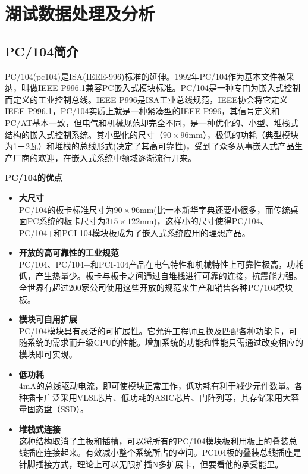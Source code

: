 %
\chapter{湖试数据处理及分析}
\section{PC/104简介}
PC/104(pc104)是ISA(IEEE-996)标准的延伸。1992年PC/104作为基本文件被采纳，叫做IEEE-P996.1兼容PC嵌入式模块标准。PC/104是一种专门为嵌入式控制而定义的工业控制总线。IEEE-P996是ISA工业总线规范，IEEE协会将它定义IEEE-P996.1，PC/104实质上就是一种紧凑型的IEEE-P996，其信号定义和PC/AT基本一致，但电气和机械规范却完全不同，是一种优化的、小型、堆栈式结构的嵌入式控制系统。其小型化的尺寸（$90\times 96$mm），极低的功耗（典型模块为1－2瓦）和堆栈的总线形式(决定了其高可靠性)，受到了众多从事嵌入式产品生产厂商的欢迎，在嵌入式系统中领域逐渐流行开来。

\textbf{\xiaoer PC/104的优点}
\begin{itemize}
  \item\textbf{\sanhao 大尺寸}\\
    PC/104的板卡标准尺寸为$90\times 96$mm(比一本新华字典还要小很多，而传统桌面PC系统的板卡尺寸为$315\times 122$mm)，这样小的尺寸使得PC/104、PC/104+和PCI-104模块板成为了嵌入式系统应用的理想产品。
  \item\textbf{\sanhao 开放的高可靠性的工业规范}\\ PC/104、PC/104+和PCI-104产品在电气特性和机械特性上可靠性极高，功耗低，产生热量少。板卡与板卡之间通过自堆栈进行可靠的连接，抗震能力强。全世界有超过200家公司使用这些开放的规范来生产和销售各种PC/104模块板。
  \item\textbf{\sanhao 模块可自用扩展}\\ PC/104模块具有灵活的可扩展性。它允许工程师互换及匹配各种功能卡，可随系统的需求而升级CPU的性能。增加系统的功能和性能只需通过改变相应的模块即可实现。
  \item\textbf{\sanhao 低功耗}\\ 4mA的总线驱动电流，即可使模块正常工作，低功耗有利于减少元件数量。各种插卡广泛采用VLSI芯片、低功耗的ASIC芯片、门阵列等，其存储采用大容量固态盘（SSD）。
  \item\textbf{\sanhao 堆栈式连接}\\ 这种结构取消了主板和插槽，可以将所有的PC/104模块板利用板上的叠装总线插座连接起来。有效减小整个系统所占的空间。PC104板的叠装总线插座是针脚插接方式，理论上可以无限扩插N多扩展卡，但要看他的承受能里。
\end{itemize}
